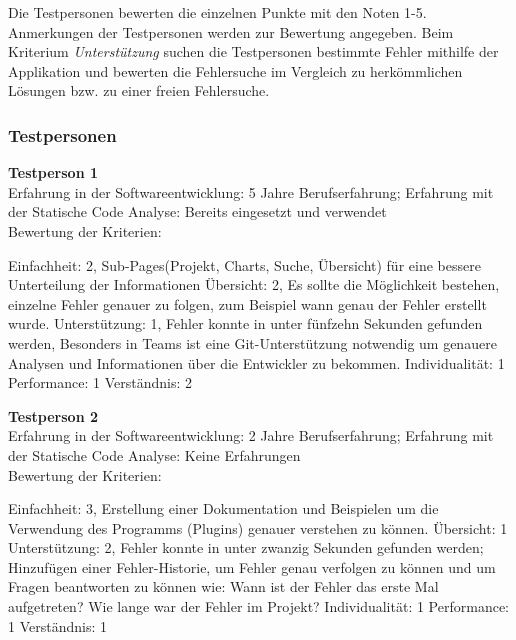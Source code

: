 Die Testpersonen bewerten die einzelnen Punkte mit den Noten 1-5. Anmerkungen der Testpersonen werden zur Bewertung angegeben. Beim Kriterium \textit{Unterstützung} suchen die Testpersonen bestimmte Fehler  mithilfe der Applikation und bewerten die Fehlersuche im Vergleich zu herkömmlichen Lösungen bzw. zu einer freien Fehlersuche.
\subsubsection{Testpersonen}
\textbf{Testperson 1} \\
Erfahrung in der Softwareentwicklung: 5 Jahre Berufserfahrung; Erfahrung mit der Statische Code Analyse: Bereits eingesetzt und verwendet \\
Bewertung der Kriterien:

Einfachheit: 2, Sub-Pages(Projekt, Charts, Suche, Übersicht) für eine bessere Unterteilung der Informationen \newline Übersicht: 2, Es sollte die Möglichkeit bestehen, einzelne Fehler genauer zu folgen, zum Beispiel wann genau der Fehler erstellt wurde. \newline  Unterstützung: 1, Fehler konnte in unter fünfzehn Sekunden gefunden werden, Besonders in Teams ist eine Git-Unterstützung notwendig um genauere Analysen und Informationen über die Entwickler zu bekommen.  \newline  Individualität: 1 \newline  Performance: 1 \newline  Verständnis: 2 \newline 

\textbf{Testperson 2} \\
Erfahrung in der Softwareentwicklung: 2 Jahre Berufserfahrung; Erfahrung mit der Statische Code Analyse: Keine Erfahrungen\\
Bewertung der Kriterien:

Einfachheit: 3, Erstellung einer Dokumentation und Beispielen um die Verwendung des Programms (Plugins) genauer verstehen zu können. \newline  Übersicht: 1 \newline  Unterstützung: 2, Fehler konnte in unter zwanzig Sekunden gefunden werden; Hinzufügen einer Fehler-Historie, um Fehler genau verfolgen zu können und um Fragen beantworten zu können wie: Wann ist der Fehler das erste Mal aufgetreten? Wie lange war der Fehler im Projekt? \newline  Individualität: 1 \newline  Performance: 1 \newline  Verständnis: 1 \newline 

